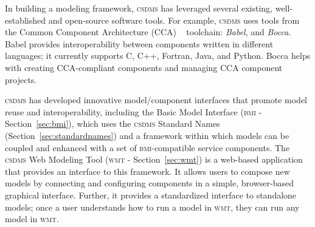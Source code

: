 \documentclass[11pt, oneside]{amsart}
\DeclareRobustCommand{\csdms}{\textsc{csdms}}
\DeclareRobustCommand{\bmi}{\textsc{bmi}}
\DeclareRobustCommand{\wmt}{\textsc{wmt}}
\begin{document}
In building a modeling framework, \csdms{} has leveraged
several existing, well-established and open-source software tools. For example,
\csdms{} uses tools from the Common Component Architecture (CCA)
~\cite{armstrong1999toward} toolchain: \emph{Babel}, and \emph{Bocca}. Babel
provides interoperability between components
written in different languages; it currently supports C, C++, Fortran, Java,
and Python. Bocca helps with creating CCA-compliant components and managing CCA
component projects.

\csdms{} has developed innovative model/component interfaces that promote
model reuse and interoperability,
including the Basic Model Interface (\bmi{} - Section~\ref{sec:bmi}), which
uses
the \csdms{} Standard Names (Section~\ref{sec:standardnames}) and a framework
within which models can be coupled and enhanced with a set of \bmi{}-compatible
service components.
The \csdms{} Web Modeling Tool (\wmt{} - Section~\ref{sec:wmt}) is a
web-based application that provides an interface to this
framework.
It allows users to compose new models by connecting and
configuring components in a simple, browser-based graphical interface.
Further, it provides a standardized interface to standalone models;
once a user understands how to run a model in \wmt{},
they can run any model in \wmt{}.
\end{document}
